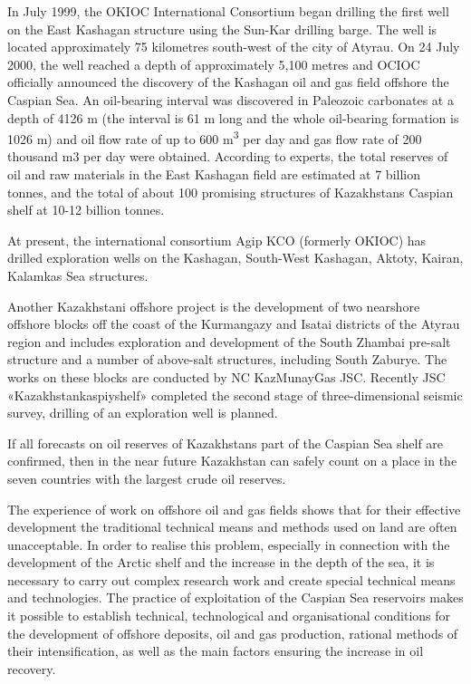 In July 1999, the OKIOC International Consortium began drilling the
first well on the East Kashagan structure using the Sun-Kar drilling
barge. The well is located approximately 75 kilometres south-west of the
city of Atyrau. On 24 July 2000, the well reached a depth of
approximately 5,100 metres and OCIOC officially announced the discovery
of the Kashagan oil and gas field offshore the Caspian Sea. An
oil-bearing interval was discovered in Paleozoic carbonates at a depth
of 4126 m (the interval is 61 m long and the whole oil-bearing formation
is 1026 m) and oil flow rate of up to 600 m\textsuperscript{3} per day
and gas flow rate of 200 thousand m3 per day were obtained. According to
experts, the total reserves of oil and raw materials in the East
Kashagan field are estimated at 7 billion tonnes, and the total of about
100 promising structures of Kazakhstan\textquotesingle s Caspian shelf
at 10-12 billion tonnes.

At present, the international consortium Agip KCO (formerly OKIOC) has
drilled exploration wells on the Kashagan, South-West Kashagan, Aktoty,
Kairan, Kalamkas Sea structures.

Another Kazakhstani offshore project is the development of two nearshore
offshore blocks off the coast of the Kurmangazy and Isatai districts of
the Atyrau region and includes exploration and development of the South
Zhambai pre-salt structure and a number of above-salt structures,
including South Zaburye. The works on these blocks are conducted by NC
KazMunayGas JSC. Recently JSC «Kazakhstankaspiyshelf» completed the
second stage of three-dimensional seismic survey, drilling of an
exploration well is planned.

If all forecasts on oil reserves of Kazakhstan\textquotesingle s part of
the Caspian Sea shelf are confirmed, then in the near future Kazakhstan
can safely count on a place in the seven countries with the largest
crude oil reserves.

The experience of work on offshore oil and gas fields shows that for
their effective development the traditional technical means and methods
used on land are often unacceptable. In order to realise this problem,
especially in connection with the development of the Arctic shelf and
the increase in the depth of the sea, it is necessary to carry out
complex research work and create special technical means and
technologies. The practice of exploitation of the Caspian Sea reservoirs
makes it possible to establish technical, technological and
organisational conditions for the development of offshore deposits, oil
and gas production, rational methods of their intensification, as well
as the main factors ensuring the increase in oil recovery.

